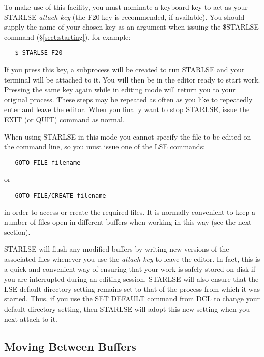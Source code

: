 To make use of this facility, you must nominate a keyboard key to act as your
STARLSE {\em attach key} (the F20 key is recommended, if available). You should
supply the name of your chosen key as an argument when issuing the \$STARLSE
command (\S\ref{sect:starting}), for example:

\begin{verbatim}
   $ STARLSE F20
\end{verbatim}

If you press this key, a subprocess will be created to run STARLSE and your
terminal will be attached to it. You will then be in the editor ready to start
work. Pressing the same key again while in editing mode will return you to your
original process. These steps may be repeated as often as you like to repeatedly
enter and leave the editor. When you finally want to stop STARLSE, issue the
EXIT (or QUIT) command as normal.

When using STARLSE in this mode you cannot specify the  file to be edited on the
command line, so you must issue one of the LSE commands:

\begin{verbatim}
   GOTO FILE filename
\end{verbatim}

or

\begin{verbatim}
   GOTO FILE/CREATE filename
\end{verbatim}

in order to access or create the required files. It is normally convenient to
keep a number of files open in different buffers when working in this way (see
the next section).

STARLSE will flush any modified buffers by writing new versions of the
associated files whenever you use the {\em attach key} to leave the editor. In
fact, this is a quick and convenient way of ensuring that your work is safely
stored on disk if you are interrupted during an editing session. STARLSE will
also ensure that the LSE default directory setting remains set to that of the
process from which it was started. Thus, if you use the SET DEFAULT command from
DCL to change your default directory setting, then STARLSE will adopt this new
setting when you next attach to it.

\subsection{Moving Between Buffers}
\label{sect:buffernavigation}

